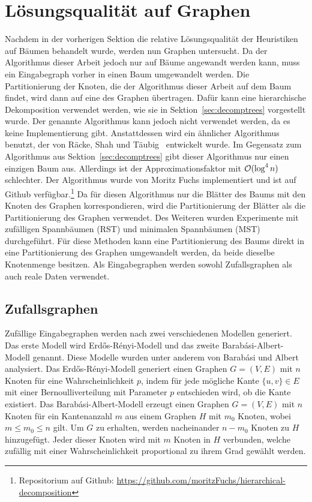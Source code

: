 \pagebreak

\section{Lösungsqualität auf Graphen}
Nachdem in der vorherigen Sektion die relative Lösungsqualität der Heuristiken auf Bäumen behandelt wurde, werden nun Graphen untersucht.
Da der Algorithmus dieser Arbeit jedoch nur auf Bäume angewandt werden kann, muss ein Eingabegraph vorher in einen Baum umgewandelt werden.
Die Partitionierung der Knoten, die der Algorithmus dieser Arbeit auf dem Baum findet, wird dann auf eine des Graphen übertragen.
Dafür kann eine hierarchische Dekomposition verwendet werden, wie sie in Sektion~\ref{sec:decomptrees} vorgestellt wurde.
Der genannte Algorithmus kann jedoch nicht verwendet werden, da es keine Implementierung gibt.
Anstattdessen wird ein ähnlicher Algorithmus benutzt, der von Räcke, Shah und Täubig~\cite{RST14} entwickelt wurde.
Im Gegensatz zum Algorithmus aus Sektion~\ref{sec:decomptrees} gibt dieser Algorithmus nur einen einzigen Baum aus.
Allerdings ist der Approximationsfaktor mit $\mathcal{O}(\log^4 n)$ schlechter.
Der Algorithmus wurde von Moritz Fuchs implementiert und ist auf Github verfügbar.\footnote{Repositorium auf Github: \url{https://github.com/moritzFuchs/hierarchical-decomposition}}
Da für diesen Algorithmus nur die Blätter des Baums mit den Knoten des Graphen korrespondieren, wird die Partitionierung der Blätter als die Partitionierung des Graphen verwendet.
Des Weiteren wurden Experimente mit zufälligen Spannbäumen (RST) und minimalen Spannbäumen (MST) durchgeführt.
Für diese Methoden kann eine Partitionierung des Baums direkt in eine Partitionierung des Graphen umgewandelt werden, da beide dieselbe Knotenmenge besitzen.
Als Eingabegraphen werden sowohl Zufallsgraphen als auch reale Daten verwendet.

\subsection{Zufallsgraphen}
Zufällige Eingabegraphen werden nach zwei verschiedenen Modellen generiert.
Das erste Modell wird Erdős-Rényi-Modell und das zweite Barabási-Albert-Modell genannt.
Diese Modelle wurden unter anderem von Barabási und Albert~\cite{AB02} analysiert.
Das Erdős-Rényi-Modell generiert einen Graphen $G=(V,E)$ mit $n$ Knoten für eine Wahrscheinlichkeit $p$, indem für jede mögliche Kante $\{u, v\} \in E$ mit einer Bernoulliverteilung mit Parameter $p$ entschieden wird, ob die Kante existiert.
Das Barabási-Albert-Modell erzeugt einen Graphen $G=(V,E)$ mit $n$ Knoten für ein Kantenanzahl $m$ aus einem Graphen $H$ mit $m_0$ Knoten, wobei $m \leq m_0 \leq n$ gilt.
Um $G$ zu erhalten, werden nacheinander $n - m_0$ Knoten zu $H$ hinzugefügt.
Jeder dieser Knoten wird mit $m$ Knoten in $H$ verbunden, welche zufällig mit einer Wahrscheinlichkeit proportional zu ihrem Grad gewählt werden.

